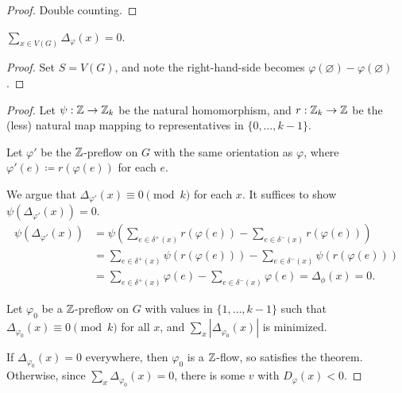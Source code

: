 \documentclass[main.tex]{subfiles}
\begin{document}
\begin{proof}
  Double counting.
\end{proof}
\begin{corollary}
  $\sum_{x\in V(G)}\Delta_\varphi(x) = 0$.
\end{corollary}
\begin{proof}
  Set $S = V(G)$, and note the right-hand-side becomes
  $\varphi(\varnothing) - \varphi(\varnothing)$.
\end{proof}
\begin{proof}
  Let $\psi:\mathbb Z\to\mathbb Z_k$ be the natural homomorphism, and $r:\mathbb Z_k\to\mathbb Z$ be
  the (less) natural map mapping to representatives in $\{0,\ldots,k-1\}$.

  Let $\varphi'$ be the $\mathbb Z$-preflow on $G$ with the same orientation as
  $\varphi$, where $\varphi'(e)\coloneqq r(\varphi(e))$ for each $e$.

  We argue that $\Delta_{\varphi'}(x)\equiv 0\pmod k$ for each $x$.
  It suffices to show $\psi(\Delta_{\varphi'}(x)) = 0$.
  \begin{align*}
    \psi(\Delta_{\varphi'}(x))
    &= \psi\left(\sum_{e\in\delta^+(x)}r(\varphi(e)) - \sum_{e\in\delta^-(x)}r(\varphi(e))\right) \\
    &= \sum_{e\in\delta^+(x)}\psi(r(\varphi(e))) - \sum_{e\in\delta^-(x)}\psi(r(\varphi(e))) \\
    &= \sum_{e\in\delta^+(x)}\varphi(e) - \sum_{e\in\delta^-(x)}\varphi(e)
    = \Delta_\phi(x) = 0.
  \end{align*}

  Let $\varphi_0$ be a $\mathbb Z$-preflow on $G$ with values in $\{1,\ldots,k-1\}$
  such that $\Delta_{\varphi_0}(x)\equiv 0\pmod k$ for all $x$,
  and $\sum_x|\Delta_{\varphi_0}(x)|$ is minimized.

  If $\Delta_{\varphi_0}(x) = 0$ everywhere, then $\varphi_0$ is a $\mathbb Z$-flow,
  so satisfies the theorem.
  Otherwise, since $\sum_x\Delta_{\varphi_0}(x) = 0$, there is some $v$ with
  $D_{\varphi}(x) < 0$.


\end{proof}
\end{document}
